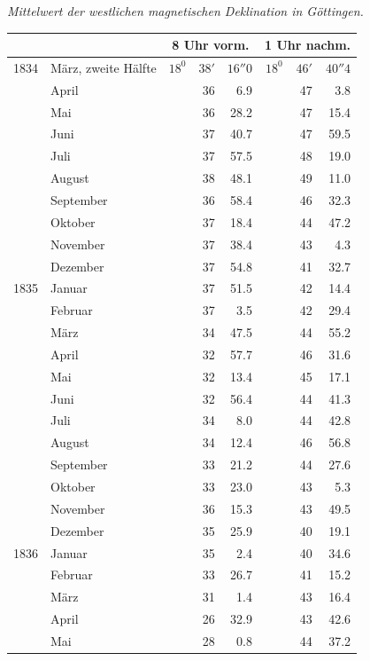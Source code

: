\begin{center}\textit{Mittelwert der westlichen magnetischen Deklination in Göttingen.}\end{center}
\begin{center}\small
\begin{tabular}{rl|rrr|rrr}
&&\multicolumn{3}{c|}{8 Uhr vorm.}&\multicolumn{3}{c}{1 Uhr nachm.}\\\hline
1834&März, zweite Hälfte&$18^0$&$38'$&$16''0$&$18^0$&$46'$&$40''4$\\
&April&&36&6.9&&47&3.8\\
&Mai&&36&28.2&&47&15.4\\
&Juni&&37&40.7&&47&59.5\\
&Juli&&37&57.5&&48&19.0\\
&August&&38&48.1&&49&11.0\\
&September&&36&58.4&&46&32.3\\
&Oktober&&37&18.4&&44&47.2\\
&November&&37&38.4&&43&4.3\\
&Dezember&&37&54.8&&41&32.7\\[4pt]
1835&Januar&&37&51.5&&42&14.4\\
&Februar&&37&3.5&&42&29.4\\
&März&&34&47.5&&44&55.2\\
&April&&32&57.7&&46&31.6\\
&Mai&&32&13.4&&45&17.1\\
&Juni&&32&56.4&&44&41.3\\
&Juli&&34&8.0&&44&42.8\\
&August&&34&12.4&&46&56.8\\
&September&&33&21.2&&44&27.6\\
&Oktober&&33&23.0&&43&5.3\\
&November&&36&15.3&&43&49.5\\
&Dezember&&35&25.9&&40&19.1\\[4pt]
1836&Januar&&35&2.4&&40&34.6\\
&Februar&&33&26.7&&41&15.2\\
&März&&31&1.4&&43&16.4\\
&April&&26&32.9&&43&42.6\\
&Mai&&28&0.8&&44&37.2
\end{tabular}
\end{center}
